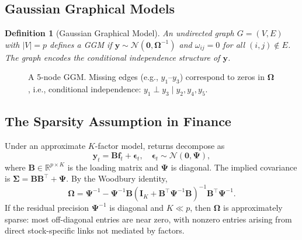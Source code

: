 \documentclass[11pt,a4paper]{article}
\newtheorem{definition}[theorem]{Definition}
\newcommand{\R}{\mathbb{R}}
\newcommand{\Normal}{\mathcal{N}}
\newcommand{\bOmega}{\bm{\Omega}}
\newcommand{\bSigma}{\bm{\Sigma}}
\begin{document}
\subsection{Gaussian Graphical Models}

\begin{definition}[Gaussian Graphical Model]
An undirected graph $G = (V, E)$ with $|V| = p$ defines a GGM if $\bm{y} \sim \Normal(\bm{0}, \bOmega^{-1})$ and $\omega_{ij} = 0$ for all $(i,j) \notin E$. The graph encodes the conditional independence structure of $\bm{y}$.
\end{definition}

\begin{figure}[h]
\centering
{}
\caption{A 5-node GGM. Missing edges (e.g., $y_1$--$y_3$) correspond to zeros in $\bOmega$, i.e., conditional independence: $y_1 \perp y_3 \mid y_2, y_4, y_5$.}
\label{fig:ggm-example}
\end{figure}

\subsection{The Sparsity Assumption in Finance}

Under an approximate $K$-factor model, returns decompose as
\begin{equation}
  \bm{y}_t = \bm{B}\bm{f}_t + \bm{\epsilon}_t, \quad \bm{\epsilon}_t \sim \Normal(\bm{0},\bm{\Psi}),
\end{equation}
where $\bm{B}\in\R^{p\times K}$ is the loading matrix and $\bm{\Psi}$ is diagonal. The implied covariance is $\bSigma = \bm{B}\bm{B}^\top + \bm{\Psi}$. By the Woodbury identity,
\begin{equation}
  \bOmega = \bm{\Psi}^{-1} - \bm{\Psi}^{-1}\bm{B}(\bm{I}_K + \bm{B}^\top\bm{\Psi}^{-1}\bm{B})^{-1}\bm{B}^\top\bm{\Psi}^{-1}.
\end{equation}
If the residual precision $\bm{\Psi}^{-1}$ is diagonal and $K \ll p$, then $\bOmega$ is approximately sparse: most off-diagonal entries are near zero, with nonzero entries arising from direct stock-specific links not mediated by factors.
\end{document}
